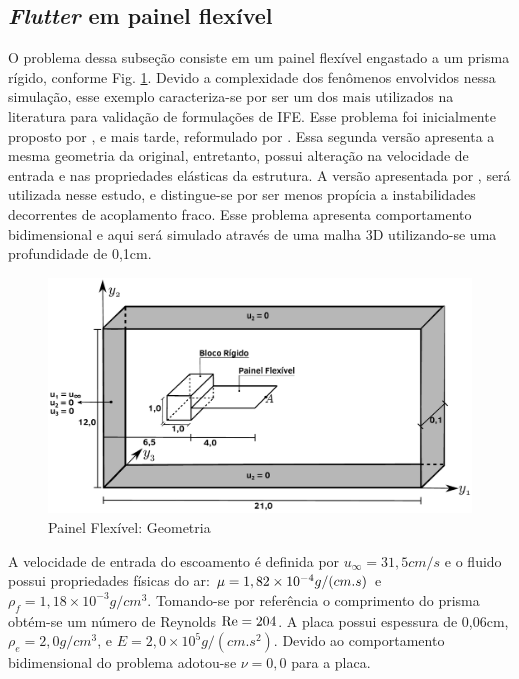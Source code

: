 \documentclass[tese_patricia]{subfiles}
\begin{document}
\subsection{\textit{Flutter} em painel flexível}

O problema dessa subseção consiste em um painel flexível engastado a um prisma rígido, conforme Fig. \ref{fig:prisma_geometria}. Devido a complexidade dos fenômenos envolvidos nessa simulação, esse exemplo caracteriza-se por ser um dos mais utilizados na literatura para validação de formulações de IFE. Esse problema foi inicialmente proposto por , e mais tarde, reformulado por . Essa segunda versão apresenta a mesma geometria da original, entretanto, possui alteração na velocidade de entrada e nas propriedades elásticas da estrutura. A versão apresentada por , será utilizada nesse estudo, e distingue-se por ser menos propícia a instabilidades decorrentes de acoplamento fraco. Esse problema apresenta comportamento bidimensional e aqui será simulado através de uma malha 3D utilizando-se uma profundidade de 0,1cm.

\begin{figure}[htb!]
	\centering 
	\includegraphics[scale=0.5,trim=0cm 0cm 0cm 0cm, clip=true]{Imagens/Cap7/prisma_geometria.pdf}	
	\caption{Painel Flexível: Geometria}
	\label{fig:prisma_geometria}
\end{figure}

A velocidade de entrada do escoamento é definida por $u_{\infty} = 31,5 cm/s$ e o fluido possui propriedades físicas do ar: $\mu=1,82\times10^{-4} g/(cm.s)$ e $\rho_{f} = 1,18\times10^{-3} g/cm^3 $. Tomando-se por referência o comprimento do prisma obtém-se um número de Reynolds $\mathrm{Re} = 204$. A placa possui espessura de 0,06cm, $\rho_{e} =  2,0 g/cm^3 $, e $E = 2,0\times10^{5} g/(cm.s^2)$. Devido ao comportamento bidimensional do problema adotou-se $\nu=0,0$ para a placa. 
\end{document}

